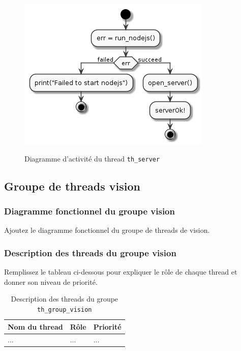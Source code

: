 \documentclass[11pt, a4paper]{paper}
\begin{document}
\begin{figure}[htbp]
\label{fig:act_envoyer}
\begin{center}
{\includegraphics[scale=.3]{./figures-pdf/th_server}}
{\caption{Diagramme d'activité du thread {\tt th\_server}}}
\end{center}
\end{figure}
\FloatBarrier

\subsection{Groupe de threads vision}

\subsubsection{Diagramme fonctionnel du groupe vision}

{\color{blue} Ajoutez le diagramme fonctionnel du groupe de threads de vision.}

\subsubsection{Description des threads du groupe vision}
{\color{red} Remplissez le tableau ci-dessous pour expliquer le rôle de chaque thread et donner son niveau de priorité.}


\begin{table}[htp]
\caption{Description des threads du groupe {\tt th\_group\_vision}}
\begin{center}
\begin{tabular}{|p{3cm}|p{8.5cm}|p{2cm}|}
\hline
\bf Nom du thread &	\bf Rôle &	\bf Priorité \\
\hline
\hline
\color{blue}... &	\color{blue}... &	\color{blue}...\\
\hline
\end{tabular}
\end{center}
\label{tab:gt_moniteur}
\end{table}%
\FloatBarrier
\end{document}
